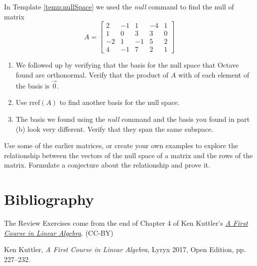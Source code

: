 \documentclass{ximera}
\begin{document}
\begin{problem}\label{prob_oct_Rn1}
    In Template \ref{temp:nullSpace} we used the \emph{null} command to find the null of matrix $$A=\begin{bmatrix}2&-1&1&-4&1\\1&0&3&3&0\\-2&1&-1&5&2\\4&-1&7&2&1\end{bmatrix}$$ 

    \begin{enumerate}
        \item We followed up by verifying that the basis for the null space that Octave found are orthonormal.  Verify that the product of $A$ with of each element of the basis is $\vec{0}$.
        \item Use $\text{rref}(A)$ to find another basis for the null space.  
        \item The basis we found using the \emph{null} command and the basis you found in part (b) look very different.  Verify that they span the same subspace.
    \end{enumerate}
\end{problem}

\begin{problem}\label{prob_oct_Rn2}
    Use some of the earlier matrices, or create your own examples to explore the relationship between the vectors of the null space of a matrix and the rows of the matrix.  Formulate a conjecture about the relationship and prove it.
\end{problem}

\section*{Bibliography}
The Review Exercises come from the end of Chapter 4 of Ken Kuttler's \href{https://open.umn.edu/opentextbooks/textbooks/a-first-course-in-linear-algebra-2017}{\it A First Course in Linear Algebra}. (CC-BY)

Ken Kuttler, {\it  A First Course in Linear Algebra}, Lyryx 2017, Open Edition, pp. 227--232.  
\end{document}
